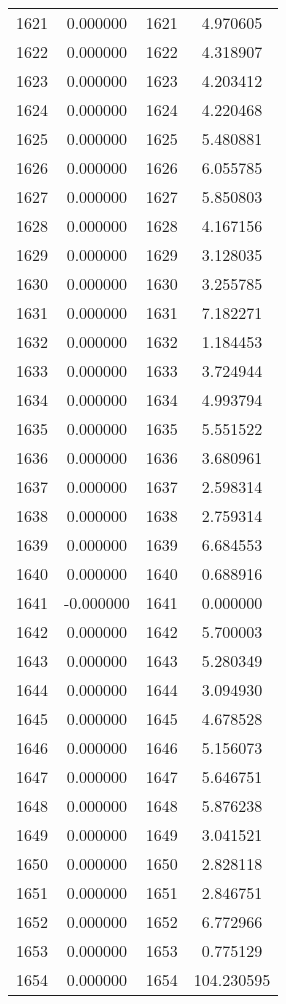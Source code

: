\documentclass[12pt]{article}
\begin{document}
\begin{longtable}{@{}cccc@{}}
1621 & 0.000000 & 1621 & 4.970605 \\
1622 & 0.000000 & 1622 & 4.318907 \\
1623 & 0.000000 & 1623 & 4.203412 \\
1624 & 0.000000 & 1624 & 4.220468 \\
1625 & 0.000000 & 1625 & 5.480881 \\
1626 & 0.000000 & 1626 & 6.055785 \\
1627 & 0.000000 & 1627 & 5.850803 \\
1628 & 0.000000 & 1628 & 4.167156 \\
1629 & 0.000000 & 1629 & 3.128035 \\
1630 & 0.000000 & 1630 & 3.255785 \\
1631 & 0.000000 & 1631 & 7.182271 \\
1632 & 0.000000 & 1632 & 1.184453 \\
1633 & 0.000000 & 1633 & 3.724944 \\
1634 & 0.000000 & 1634 & 4.993794 \\
1635 & 0.000000 & 1635 & 5.551522 \\
1636 & 0.000000 & 1636 & 3.680961 \\
1637 & 0.000000 & 1637 & 2.598314 \\
1638 & 0.000000 & 1638 & 2.759314 \\
1639 & 0.000000 & 1639 & 6.684553 \\
1640 & 0.000000 & 1640 & 0.688916 \\
1641 & -0.000000 & 1641 & 0.000000 \\
1642 & 0.000000 & 1642 & 5.700003 \\
1643 & 0.000000 & 1643 & 5.280349 \\
1644 & 0.000000 & 1644 & 3.094930 \\
1645 & 0.000000 & 1645 & 4.678528 \\
1646 & 0.000000 & 1646 & 5.156073 \\
1647 & 0.000000 & 1647 & 5.646751 \\
1648 & 0.000000 & 1648 & 5.876238 \\
1649 & 0.000000 & 1649 & 3.041521 \\
1650 & 0.000000 & 1650 & 2.828118 \\
1651 & 0.000000 & 1651 & 2.846751 \\
1652 & 0.000000 & 1652 & 6.772966 \\
1653 & 0.000000 & 1653 & 0.775129 \\
1654 & 0.000000 & 1654 & 104.230595 \\

\end{longtable}
\end{document}
